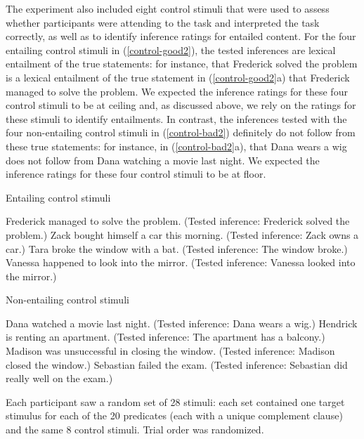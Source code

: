 \documentclass[11pt,fleqn]{article}
\newcommand{\6}{\mbox{$[\hspace*{-.6mm}[$}}
\newcommand{\9}{\mbox{$]\hspace*{-.6mm}]$}}
\begin{document}
The experiment also included eight control stimuli that were used to assess whether participants were attending to the task and interpreted the task correctly, as well as to identify inference ratings for entailed content. For the four entailing control stimuli in (\ref{control-good2}), the tested inferences are lexical entailment of the true statements: for instance, that Frederick solved the problem is a lexical entailment of the true statement in (\ref{control-good2}a) that Frederick managed to solve the problem. We expected the inference ratings for these four control stimuli to be at ceiling and, as discussed above, we rely on the ratings for these stimuli to identify entailments. In contrast, the inferences tested with the four non-entailing control stimuli in (\ref{control-bad2}) definitely do not follow from these true statements: for instance, in (\ref{control-bad2}a), that Dana wears a wig does not follow from Dana watching a movie last night. We expected the inference ratings for these four control stimuli to be at floor.

\begin{exe}
\ex\label{control-good2} Entailing control stimuli
\begin{xlist}
 Frederick managed to solve the problem. (Tested inference: Frederick solved the problem.)
 Zack bought himself a car this morning. (Tested inference: Zack owns a car.)
 Tara broke the window with a bat. (Tested inference: The window broke.)
 Vanessa happened to look into the mirror. (Tested inference: Vanessa looked into the mirror.)
\end{xlist}
\ex\label{control-bad2} Non-entailing control stimuli
\begin{xlist}
 Dana watched a movie last night. (Tested inference: Dana wears a wig.)
 Hendrick is renting an apartment. (Tested inference: The apartment has a balcony.)
 Madison was unsuccessful in closing the window. (Tested inference:  Madison closed the window.)
 Sebastian failed the exam. (Tested inference: Sebastian did really well on the exam.)
\end{xlist}
\end{exe}

Each participant saw a random set of 28 stimuli: each set contained one target stimulus for each of the 20 predicates (each with a unique complement clause) and the same 8 control stimuli. Trial order was randomized.
\end{document}
